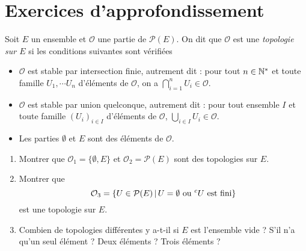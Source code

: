 \section{Exercices d'approfondissement}

\begin{exercice}[Topologies]
Soit $E$ un ensemble et  $\mathcal O$ une partie de $\mathcal P(E)$. On dit que $\mathcal O$ est une \emph{topologie sur $E$} si les conditions suivantes sont vérifiées
\begin{itemize}
\item $\mathcal O$ est stable par intersection finie, autrement dit : pour tout $n\in \mathbb{N}^*$ et toute famille $U_1, \cdots U_n$ d'éléments de $\mathcal O$, on a $\bigcap_{i=1}^n U_i\in \mathcal O$.
\item $\mathcal O$ est stable par union quelconque, autrement dit : pour tout ensemble $I$ et toute famille $(U_i)_{i\in I}$ d'éléments de $\mathcal O$, $\bigcup_{i\in I}U_i \in \mathcal O$.
\item Les parties $\emptyset$ et $E$ sont des éléments de $\mathcal O$.
\end{itemize}

\begin{enumerate}
\item Montrer que $\mathcal O_1=\{\emptyset, E\}$ et $\mathcal O_2=\mathcal P(E)$ sont des topologies sur $E$.
\item Montrer que 
\[ \mathcal O_3 = \ensemble{U\in \mathcal P(E)}{U=\emptyset \text{ ou }{}^cU\text{ est fini}}
\]
est une topologie sur $E$.
\item Combien de topologies différentes y a-t-il si $E$ est l'ensemble vide ? S'il n'a qu'un seul élément ? Deux éléments ? Trois éléments ?
\end{enumerate}
\end{exercice}

